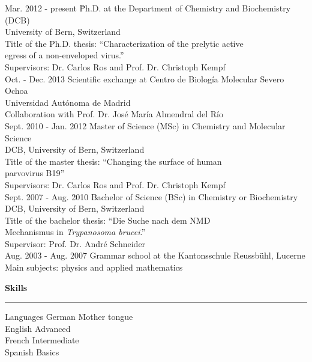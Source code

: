 \normalsize
\begin{tabbing}
Mar. 2012 - present \hspace*{0.9cm} \= Ph.D. at the Department of Chemistry and Biochemistry (DCB) \\ 
\> University of Bern, Switzerland  \\
\> Title of the Ph.D. thesis: ``Characterization of the prelytic
active \\ 
\> egress of a non-enveloped virus.'' \\
\> Supervisors: Dr. Carlos Ros and Prof. Dr. Christoph Kempf \\ [0.3cm]
Oct. - Dec. 2013 \> Scientific exchange at Centro de Biología Molecular Severo Ochoa \\
\> Universidad Autónoma de Madrid \\
\> Collaboration with Prof. Dr. José María Almendral del Río \\ [0.3cm]
Sept. 2010 - Jan. 2012 \> Master of Science (MSc) in Chemistry and Molecular Science \\
\> DCB, University of Bern, Switzerland  \\
\> Title of the master thesis: ``Changing the surface of human \\ \> parvovirus B19'' \\
\> Supervisors: Dr. Carlos Ros and Prof. Dr. Christoph Kempf \\ [0.3cm]
Sept. 2007 - Aug. 2010 \> Bachelor of Science (BSc) in Chemistry or Biochemistry \\
\> DCB, University of Bern, Switzerland  \\
\> Title of the bachelor thesis: ``Die Suche nach dem NMD \\
\> Mechanismus in \textit{Trypanosoma brucei}.'' \\
\> Supervisor: Prof. Dr. André Schneider \\ [0.3cm]
Aug. 2003 - Aug. 2007 \> Grammar school at the Kantonsschule Reussbühl, Lucerne \\
\> Main subjects: physics and applied mathematics

\end{tabbing}


\Large
\textbf{Skills}
\noindent\rule[0mm]{\linewidth}{2pt}

\normalsize
\begin{tabbing}
Languages \hspace{1cm} \= German \hspace{1cm} \= Mother tongue \\
\> English \> Advanced\\
\> French \> Intermediate \\
\> Spanish \> Basics \\
\end{tabbing}